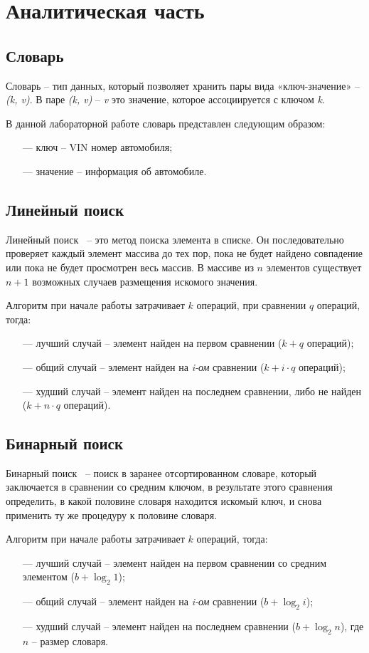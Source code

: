 \chapter{Аналитическая часть}
\section{Словарь}

Словарь -- тип данных, который позволяет хранить пары вида «ключ-значение» -- \textit{(k, v)}. 
В паре \textit{(k, v)} -- \textit{v} это значение, которое ассоциируется с ключом \textit{k}.

В данной лабораторной работе словарь представлен следующим образом:
\begin{itemize}
	\item[---] ключ -- VIN номер автомобиля;
	\item[---] значение -- информация об автомобиле.
\end{itemize}


\section{Линейный поиск}

Линейный поиск~\cite{search} -- это метод поиска элемента в списке. Он последовательно проверяет каждый элемент массива до тех пор, пока не будет найдено совпадение или пока не будет просмотрен весь массив.
В массиве из $n$ элементов существует $n + 1$ возможных случаев размещения искомого значения.

Алгоритм при начале работы затрачивает $k$ операций, при сравнении $q$ операций, тогда:
\begin{itemize}
	\item[---] лучший случай -- элемент найден на первом сравнении ($k + q$ операций);
	\item[---] общий случай -- элемент найден на \textit{i-ом} сравнении ($k + i \cdot q$ операций);
	\item[---] худший случай -- элемент найден на последнем сравнении, либо не найден ($k +  n \cdot q$ операций).
\end{itemize}


\section{Бинарный поиск}

Бинарный поиск~\cite{search} -- поиск в заранее отсортированном словаре, который заключается в сравнении со средним ключом, в результате этого сравнения определить, в какой половине словаря находится искомый ключ, и снова применить ту же процедуру к половине словаря.

Алгоритм при начале работы затрачивает $k$ операций, тогда:
\begin{itemize}
	\item[---] лучший случай -- элемент найден на первом сравнении со средним элементом ($b + \log_2 1$);
	\item[---] общий случай -- элемент найден на \textit{i-ом} сравнении ($b + \log_2 i$);
	\item[---] худший случай -- элемент найден на последнем сравнении ($b +  \log_2 n$), где $n$ -- размер словаря.
\end{itemize}
